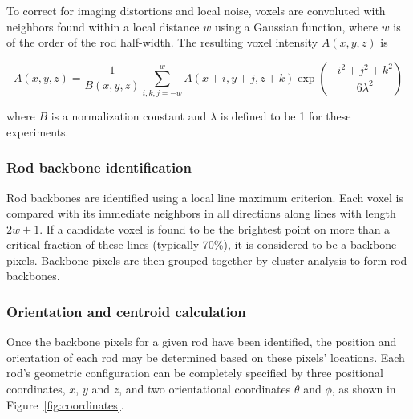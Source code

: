 To correct for imaging distortions and local noise, voxels are convoluted with neighbors found within a local
distance $w$ using a Gaussian function, where $w$ is of the order of the rod half-width. The resulting
voxel intensity $A(x,y,z)$ is

\begin{center}
\begin{equation}
A(x,y,z) = \frac{1}{B(x,y,z)} \sum_{i,k,j=-w}^w A(x+i,y+j,z+k) 
\exp{ \left( -\frac{i^2+j^2+k^2}{6\lambda^2} \right)}
\end{equation}
\end{center}

where $B$ is a normalization constant and $\lambda$ is defined to be 1 for these experiments.

\subsubsection{Rod backbone identification}


Rod backbones are identified using a local line maximum criterion.  Each voxel is compared with its immediate 
neighbors in all directions along lines with length $2w+1$.  If a candidate voxel is found to be the brightest
point on more than a critical fraction of these lines (typically 70\%), it is considered to be a backbone
pixels.  Backbone pixels are then grouped together by cluster analysis to form rod backbones.


\subsubsection{Orientation and centroid calculation}
\label{sec:orient-calculate}


Once the backbone pixels for a given rod have been identified, the position and orientation of each rod may
be determined based on these pixels' locations.  Each rod's geometric configuration can be
completely specified by three positional coordinates, $x$, $y$ and $z$, and two
orientational coordinates $\theta$ and $\phi$, as shown in Figure~\ref{fig:coordinates}.

